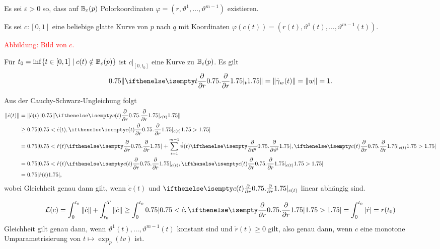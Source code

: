 \begin{bew}
  Es sei $\varepsilon > 0$ so, dass auf $\operatorname{\mathbb{B}}_{\varepsilon}(p)$ Polorkoordinaten $\varphi = (r,\vartheta^1, \ldots, \vartheta^{m-1})$ existieren.

  Es sei $c \colon [0,1]$ eine beliebige glatte Kurve von $p$ nach $q$ mit Koordinaten $\varphi(c(t)) = (r(t), \vartheta^1(t), \ldots, \vartheta^{m-1}(t))$.

  \begin{center}
    \textcolor{red}{Abbildung: Bild von $c$.}
  \end{center}

  Für $t_0 = \inf\{t \in [0,1] \mid c(t) \notin \operatorname{\mathbb{B}}_{\varepsilon}(p)\}$ ist $c|_{[0,t_0]}$ eine Kurve zu $\operatorname{\mathbb{B}}_{\varepsilon}(p)$.
  Es gilt
  \begin{align*}
    \left\|\pdifffrac[t]{}{r}\right\| = \|\dot\gamma_w(t)\| = \|w\| = 1.
  \end{align*}

  Aus der Cauchy-Schwarz-Ungleichung folgt
  \begin{align*}
    \|\dot c(t)\| & = \|\dot c(t)\|\left\|\pdifffrac[c(t)]{}{r}\right\|\\
    & \geq \left|\left< \dot c(t), \pdifffrac[c(t)]{}{r}\right>\right|\\
    & = \left|\left<\dot r(t) \pdifffrac{}{r} + \sum_{i=1}^{m-1}\dot\vartheta(t)\pdifffrac{}{\vartheta^i},\pdifffrac[c(t)]{}{r}\right>\right|\\
    & = \left|\left<\dot r(t)\pdifffrac[c(t)]{}{r}, \pdifffrac[c(t)]{}{r}\right>\right|\\
    & = \left|\dot r(t)\right|,
  \end{align*}
  wobei Gleichheit genau dann gilt, wenn $\dot c(t)$ und $\pdifffrac[c(t)]{}{r}$ linear abhängig sind.

  \begin{align*}
    \mathcal L(c) = \int_0^{t_0}\|\dot c\| + \int_{t_0}^T\|\dot c\| \geq \int_0^{t_0} \left|\left<\dot c,\pdifffrac{}{r}\right>\right| = \int_0^{t_0}|\dot r| = r(t_0)
  \end{align*}
  Gleichheit gilt genau dann, wenn $\vartheta^1(t), \ldots, \vartheta^{m-1}(t)$ konstant sind und $\dot r(t) \geq 0$ gilt, also genau dann, wenn $c$ eine monotone Umparametrisierung von $t \mapsto \exp_p(tv)$ ist.
\end{bew}


